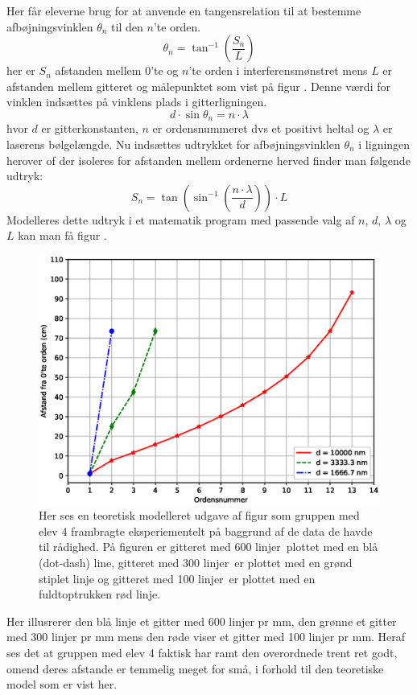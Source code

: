 Her får eleverne brug for at anvende en tangensrelation til at bestemme afbøjningsvinklen $\theta_n$ til den $n$'te orden. 
\begin{equation}
	\theta_n = \tan^{-1}\left(\frac{S_n}{L}\right)
\end{equation}
her er $S_n$ afstanden mellem 0'te og $n$'te orden i interferensmønstret mens $L$ er afstanden mellem gitteret og målepunktet som vist på figur . Denne værdi for vinklen indsættes på vinklens plads i gitterligningen.
\begin{equation}
	d\cdot\sin\theta_n = n\cdot \lambda
\end{equation}
hvor $d$ er gitterkonstanten, $n$ er ordensnummeret dvs et positivt heltal og $\lambda$ er laserens bølgelængde. Nu indsættes udtrykket for afbøjningsvinklen $\theta_n$ i ligningen herover of der isoleres for afstanden mellem ordenerne herved finder man følgende udtryk:
\begin{equation}
	S_n = \tan\left(\sin^{-1}\left(\frac{n\cdot\lambda}{d}\right)\right)\cdot L
\end{equation}
Modelleres dette udtryk i et matematik program med passende valg af $n$, $d$, $\lambda$ og $L$ kan man få figur . 
\begin{figure}[h!]
	\centering
	\includegraphics[width=\textwidth]{Figs/test}
	\caption[Eksempel på teoretisk modellering]{Her ses en teoretisk modelleret udgave af figur  som gruppen med elev 4 frambragte eksperiementelt på baggrund af de data de havde til rådighed. På figuren er gitteret med 600 linjer\per\milli\meter~plottet med en blå (dot-dash) line, gitteret med 300 linjer\per\milli\meter~er plottet med en grønd stiplet linje og gitteret med 100 linjer\per\milli\meter~er plottet med en fuldtoptrukken rød linje.}
	\label{fig:eviden.app}
\end{figure}

Her illusrerer den blå linje et gitter med 600 linjer pr mm, den grønne et gitter med 300 linjer pr mm mens den røde viser et gitter med 100 linjer pr mm. Heraf ses det at gruppen med elev 4 faktisk har ramt den overordnede trent ret godt, omend deres afstande er temmelig meget for små, i forhold til den teoretiske model som er vist her. 